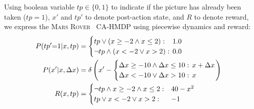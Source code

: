 \documentclass[twoside,11pt]{article}
\newcommand{\MarsRover}{\textsc{Mars Rover }}
\newcommand{\sq}{\hspace{-1mm}}
\newcommand{\sqm}{\hspace{-2mm}}
\begin{document}
Using boolean variable $tp \in \{0,1\}$ to indicate if the picture has
already been taken ($tp=1$), $x'$ and $tp'$ to denote 
post-action state, and $R$ to denote reward, we 
express the \MarsRover\ CA-HMDP using piecewise dynamics and reward:
\begin{align*} 
\hspace{-2.8mm} P(tp'\sq=\sq1|x,tp) & = 
\begin{cases}
tp \lor (x \geq -2 \land x \leq 2): & \sqm 1.0\\
\neg tp \land (x < -2 \lor x > 2):  & \sqm 0.0
\end{cases}  \\
\hspace{-2.8mm} P(x'|x,\Delta x) & = \delta \left( x' - \begin{cases}
\Delta x \geq -10 \land \Delta x \leq 10 : & \hspace{-2mm} x + \Delta x \\
\Delta x < -10 \lor \Delta x > 10 : & \hspace{-2mm} x
\end{cases}
\right)  \\
\hspace{-2.8mm} R(x,tp) & = \begin{cases}
\neg tp \land x \geq -2 \land x \leq 2 : & 40 - x^2 \\
tp \lor x < -2 \lor x > 2 : & -1
\end{cases} 
\end{align*}
\end{document}
